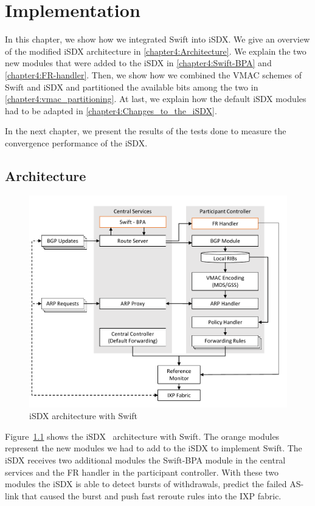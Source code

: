 \chapter{\label{chapter4}Implementation}

In this chapter, we show how we integrated Swift into iSDX. We give an overview of the modified iSDX architecture in \ref{chapter4:Architecture}. We explain the two new modules that were added to the iSDX in \ref{chapter4:Swift-BPA} and  \ref{chapter4:FR-handler}. Then, we show how we combined the VMAC schemes of Swift and iSDX and partitioned the available bits among the two in \ref{chapter4:vmac_partitioning}. At last, we explain how the default iSDX modules had to be adapted in \ref{chapter4:Changes_to_the_iSDX}.

In the next chapter, we present the results of the tests done to measure the convergence performance of the iSDX.

\section{\label{chapter4:Architecture}Architecture}

\begin{figure}[h]
\center
\includegraphics[scale = 0.7]{Figures/design_sdx_swift_cropped.pdf}
\caption{iSDX architecture with Swift}
\label{fig:isdx_architecture_with_swift}
\end{figure}

Figure~\ref{fig:isdx_architecture_with_swift} shows the iSDX~\cite{feamster2013sdx} architecture with Swift. The orange modules represent the new modules we had to add to the iSDX to implement Swift. The iSDX receives two additional modules the Swift-BPA module in the central services and the FR handler in the participant controller. With these two modules the iSDX is able to detect bursts of withdrawals, predict the failed AS-link that caused the burst and push fast reroute rules into the IXP fabric.

